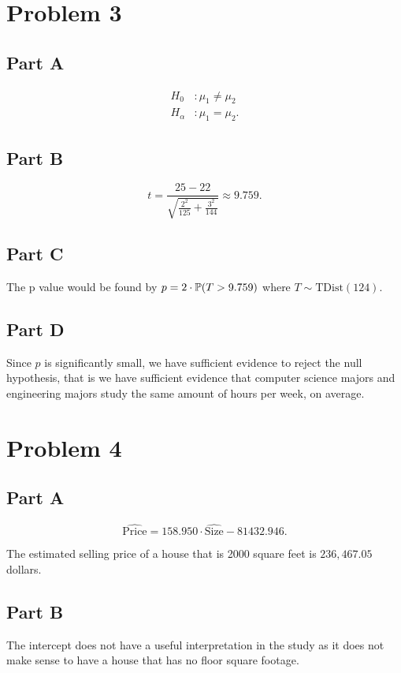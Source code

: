 \documentclass[12pt]{extarticle}
\begin{document}
\section*{Problem 3}
\subsection*{Part A}
\begin{align*}
	H_0 &: \mu_1 \neq \mu_2 \\
	H_\alpha &: \mu_1 = \mu_2
.\end{align*}

\subsection*{Part B}
\[
	t = \frac{25 - 22}{\sqrt{
			\frac{2^2}{125} + \frac{3^2}{144}
	}} \approx 9.759
.\]

\subsection*{Part C}
The p value would be found by $p = 2\cdot \mathbb{P}\qty(T > 9.759)$ where $T \sim \text{TDist}(124)$.

\subsection*{Part D}
Since $p$ is significantly small, we have sufficient evidence to reject the null hypothesis, that is we have sufficient evidence that computer science majors and engineering majors study the same amount of hours per week, on average.

\section*{Problem 4}
\subsection*{Part A}
\[
	\widehat{\text{Price}} = 158.950\cdot \widehat{\text{Size}} - 81432.946
.\]

The estimated selling price of a house that is 2000 square feet is $236,467.05$ dollars.

\subsection*{Part B}
The intercept does not have a useful interpretation in the study as it does not make sense to have a house that has no floor square footage.
\end{document}
